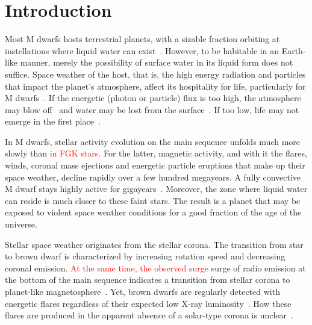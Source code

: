 \documentclass[twocolumn]{aastex631}
\begin{document}
\section{Introduction}
\label{sec:intro}
Most M dwarfs hosts terrestrial planets, with a sizable fraction orbiting at instellations where liquid water can exist~\citep{dressing2015occurrence, hardegree-ullman2019kepler, ment2023occurrence}. However, to be habitable in an Earth-like manner, merely the possibility of surface water in its liquid form does not suffice. Space weather of the host, that is, the high energy radiation and particles that impact the planet's atmosphere, affect its hospitality for life, particularly for M dwarfs~\citep{airapetian2020impact}. If the energetic (photon or particle) flux is too high, the atmosphere may blow off~\citep[e.g., ][]{lammer2003atmospheric, garraffo2017threatening, ketzer2022influence} and water may be lost from the surface~\citep{doamaral2022contribution}. If too low, life may not emerge in the first place~\citep{rimmer2018origin}.

In M dwarfs, stellar activity evolution on the main sequence unfolds much more slowly than \textcolor{red}{in FGK stars}. For the latter, magnetic activity, and with it the flares, winds, coronal mass ejections and energetic particle eruptions that make up their space weather, decline rapidly over a few hundred megayears. A fully convective M dwarf stays highly active for gigayears~\citep{magaudda2020relation, johnstone2021active, medina2022galactic}. Moreover, the zone where liquid water can reside is much closer to these faint stars. The result is a planet that may be exposed to violent space weather conditions for a good fraction of the age of the universe. 

Stellar space weather originates from the stellar corona. The transition from star to brown dwarf is characterized by increasing rotation speed and decreasing coronal emission. \textcolor{red}{At the same time, the observed surge} surge of radio emission at the bottom of the main sequence indicates a transition from stellar corona to planet-like magnetosphere~\citep{zarka1998auroral,pineda2017panchromatic}. Yet, brown dwarfs are regularly detected with energetic flares regardless of their expected low X-ray luminosity~\citep[e.g., ][]{hambaryan2004new, stelzer2006simultaneous, gizis2013kepler, paudel2020k2, schmidt2019largest}. How these flares are produced in the apparent absence of a solar-type corona is unclear~\citep{mullan2018frequencies}.%
\end{document}
